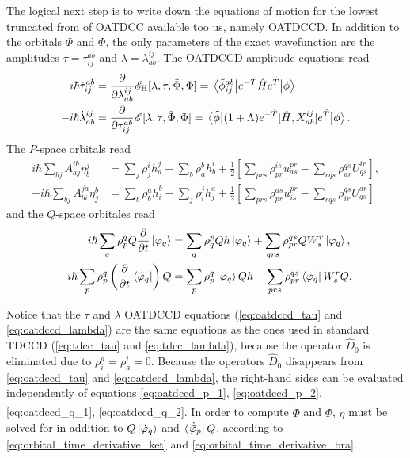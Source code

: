 The logical next step is to write down the equations of motion for the lowest 
truncated from of OATDCC available too us, namely OATDCCD. In addition to the 
orbitals $\Phi$ and $\tilde{\Phi}$, the only parameters of the exact wavefunction 
are the amplitudes $\tau = \tau^{ab}_{ij}$ and $\lambda = \lambda^{ij}_{ab}$. 
The OATDCCD amplitude equations read 
\begin{align}
    \label{eq:oatdccd_tau}
    i\hbar \dot{\tau}^{ab}_{ij} 
        &= \frac{\partial}{\partial \lambda^{ij}_{ab}}
            \mathscr{E}_{\text{H}}[\lambda, \tau, \tilde{\Phi}, \Phi]
        = \mel{\tilde{\phi}^{ab}_{ij}}
            {e^{-\hat{T}}\hat{H}e^{\hat{T}}}
        {\phi} \\
    \label{eq:oatdccd_lambda}
    -i\hbar\dot{\lambda}^{ij}_{ab}
        &= \frac{\partial}{\partial \tau^{ab}_{ij}}
            \mathscr{E}[\lambda, \tau, \tilde{\Phi}, \Phi]
        = \mel{\tilde{\phi}}
            {(1 + \Lambda)e^{-\hat{T}}[\hat{H}, X^{ij}_{ab}]e^{\hat{T}}}
            {\phi}.
\end{align}
The $P$-space orbitals read 
\begin{align}
    \label{eq:oatdccd_p_1}
    i\hbar\sum_{bj}A^{ib}_{aj} \eta^j_b
        &= \sum_j \rho^i_j h^j_a - \sum_b \rho^b_a h^i_b
        + \frac{1}{2}\left[
             \sum_{prs}\rho^{is}_{pr} u^{pr}_{as}
            -\sum_{rqs}\rho^{qs}_{ar} U^{ir}_{qs}
        \right], \\
    \label{eq:oatdccd_p_2}
    -i\hbar\sum_{bj}A^{ja}_{bi} \eta^b_j
        &= \sum_b \rho^a_b h^b_i - \sum_j \rho^j_i h^a_j
        + \frac{1}{2}\left[
             \sum_{prs}\rho^{as}_{pr} u^{pr}_{is}
            -\sum_{rqs}\rho^{qs}_{ir} U^{ar}_{qs}       
        \right]
\end{align}
and the $Q$-space orbitales read
\begin{align}
    \label{eq:oatdccd_q_1}
    i\hbar\sum_q \rho^q_p Q \frac{\partial}{\partial t} \ket{\varphi_q}
        &= \sum_q \rho^p_q Q h\ket{\varphi_q} 
            + \sum_{qrs} \rho^{qs}_{pr} Q W^r_s \ket{\varphi_q}, \\
    \label{eq:oatdccd_q_2}
    -i\hbar\sum_p \rho^q_p
    \left(\frac{\partial}{\partial t} \bra{\tilde{\varphi}_q}\right)Q
        &= \sum_p \rho^q_p \ket{\varphi_q} Q h
            + \sum_{prs} \rho^{qs}_{pr}\bra{\varphi_q} W^r_s Q.
\end{align}

Notice that the $\tau$ and $\lambda$ OATDCCD equations
(\autoref{eq:oatdccd_tau} and \autoref{eq:oatdccd_lambda}) are the 
same equations as the ones used in standard TDCCD
(\autoref{eq:tdcc_tau} and \autoref{eq:tdcc_lambda}), because the 
operator $\hat{D}_0$ is eliminated due to $\rho^a_i = \rho^i_a = 0$.
Because the operators $\hat{D}_0$ disappears from 
\autoref{eq:oatdccd_tau} and \autoref{eq:oatdccd_lambda},
the right-hand sides can be evaluated independently of 
equations \ref{eq:oatdccd_p_1}, \ref{eq:oatdccd_p_2},
\ref{eq:oatdccd_q_1}, \ref{eq:oatdccd_q_2}. In order to compute 
$\dot{\tilde{\Phi}}$ and $\dot{\Phi}$, $\eta$ must be solved for in 
addition to $Q\ket{\dot{\varphi}_q}$ and $\bra{\dot{\tilde{\varphi}}_p}Q$,
according to \autoref{eq:orbital_time_derivative_ket} and 
\autoref{eq:orbital_time_derivative_bra}.